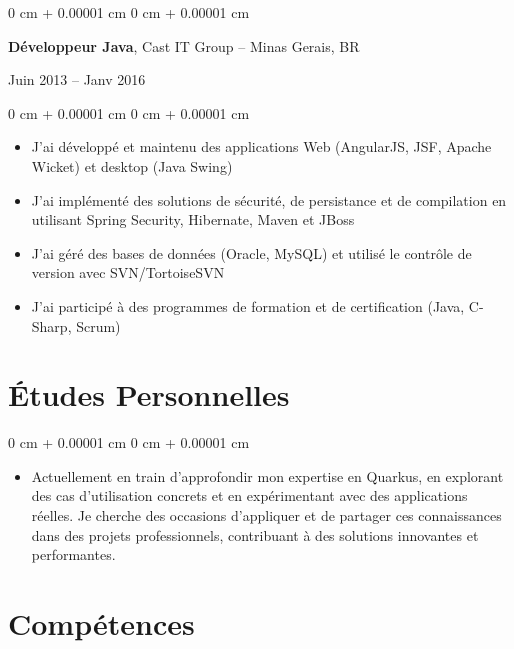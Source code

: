 \documentclass[10pt, letterpaper]{article}
\newenvironment{highlights}{
    \begin{itemize}[
        topsep=0.10 cm,
        parsep=0.10 cm,
        partopsep=0pt,
        itemsep=0pt,
        leftmargin=0 cm + 10pt
    ]
}{
    \end{itemize}
} %
\newenvironment{onecolentry}{
    \begin{adjustwidth}{
        0 cm + 0.00001 cm
    }{
        0 cm + 0.00001 cm
    }
}{
    \end{adjustwidth}
} %
\newenvironment{twocolentry}[2][]{
    \onecolentry
    \def\secondColumn{#2}
    \setcolumnwidth{\fill, 4.5 cm}
    \begin{paracol}{2}
}{
    \switchcolumn \raggedleft \secondColumn
    \end{paracol}
    \endonecolentry
} %
\begin{document}
        \vspace{0.2 cm}
        
        \begin{twocolentry}{
            Juin 2013 – Janv 2016
        }
            \textbf{Développeur Java}, Cast IT Group -- Minas Gerais, BR
        \end{twocolentry}

        \vspace{0.10 cm}
        \begin{onecolentry}
            \begin{highlights}
                \item J'ai développé et maintenu des applications Web (AngularJS, JSF, Apache Wicket) et desktop (Java Swing)
                \item J'ai implémenté des solutions de sécurité, de persistance et de compilation en utilisant Spring Security, Hibernate, Maven et JBoss
                \item J'ai géré des bases de données (Oracle, MySQL) et utilisé le contrôle de version avec SVN/TortoiseSVN
                \item J'ai participé à des programmes de formation et de certification (Java, C-Sharp, Scrum)
            \end{highlights}
        \end{onecolentry}
        
    \section{Études Personnelles}

        \vspace{0.10 cm}
        \begin{onecolentry}
            \begin{highlights}
                \item Actuellement en train d’approfondir mon expertise en Quarkus, en explorant des cas d’utilisation concrets et en expérimentant avec des applications réelles. Je cherche des occasions d’appliquer et de partager ces connaissances dans des projets professionnels, contribuant à des solutions innovantes et performantes.
            \end{highlights}
        \end{onecolentry}
        
    \section{Compétences}
\end{document}
